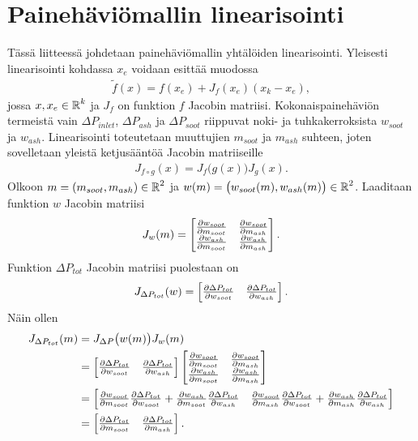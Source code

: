 
\chapter{Painehäviömallin linearisointi}%
\label{ch:linearisointi}

Tässä liitteessä johdetaan painehäviömallin yhtälöiden linearisointi. Yleisesti linearisointi kohdassa \(x_e\) voidaan esittää muodossa
\begin{align}
    \tilde{f}(x) = f(x_e) +J_f (x_e) (x_k-x_e),
\end{align}
jossa \(x, x_e \in \operatorname{\mathbb{R}}^k\) ja \(J_f\) on funktion \(f\) Jacobin matriisi. 
Kokonaispainehäviön termeistä vain \(\Delta P_{inlet}\), \(\Delta P_{ash}\) ja \(\Delta P_{soot}\) riippuvat noki- ja tuhkakerroksista \(w_{soot}\) ja \(w_{ash}\). 
Linearisointi toteutetaan muuttujien \(m_{soot}\) ja \( m_{ash}\) suhteen, joten
sovelletaan yleistä ketjusääntöä Jacobin matriiseille
\begin{align}
    J_{f \circ g}(x) = J_f\big(g(x)\big)  J_g(x).
\end{align}
Olkoon \(m = \left(m_{soot}, m_{ash}\right) \in \operatorname{\mathbb{R}}^2\) ja \(w(m) = \big(w_{soot}(m), w_{ash}(m)  \big) \in \operatorname{\mathbb{R}}^2\). Laaditaan funktion \(w\) Jacobin matriisi
\begin{align}
    J_w(m)=
    \begin{bmatrix} 
        \frac{\partial w_{soot}}{\partial m_{soot}} & \frac{\partial w_{soot}}{\partial m_{ash}}
    \\  \frac{\partial w_{ash}}{\partial m_{soot}} & \frac{\partial w_{ash}}{\partial m_{ash}}
     \end{bmatrix}.
\end{align}
 Funktion \(\Delta P_{tot}\) Jacobin matriisi puolestaan on 
\begin{align}
    J_{\Delta P_{tot}}(w) = \begin{bmatrix}   \frac{\partial \Delta P_{tot}}{\partial w_{soot}}
    &   \frac{\partial \Delta P_{tot}}{\partial w_{ash}}
     \end{bmatrix}.
\end{align}
Näin ollen 
\begin{align}
    \begin{split}
        J_{\Delta P_{tot}}(m)&=
        J_{\Delta P}\big(w(m)\big)  J_{w}(m)
\\ &=
    \begin{bmatrix}   
        \frac{\partial \Delta P_{tot}}{\partial w_{soot}}
        &   
        \frac{\partial \Delta P_{tot}}{\partial w_{ash}}
         \end{bmatrix}
    \begin{bmatrix} 
        \frac{\partial w_{soot}}{\partial m_{soot}} & \frac{\partial w_{soot}}{\partial m_{ash}}
        \\ 
        \frac{\partial w_{ash}}{\partial m_{soot}} & \frac{\partial w_{ash}}{\partial m_{ash}}
         \end{bmatrix}
\\ &=
    \begin{bmatrix} 
        \frac{\partial w_{soot}}{\partial m_{soot}}
        \frac{\partial \Delta P_{tot}}{\partial w_{soot}}
        +
        \frac{\partial w_{ash}}{\partial m_{soot}}
        \frac{\partial \Delta P_{tot}}{\partial w_{ash}}
        &
        \frac{\partial w_{soot}}{\partial m_{ash}}
        \frac{\partial \Delta P_{tot}}{\partial w_{soot}}
        +
        \frac{\partial w_{ash}}{\partial m_{ash}}
        \frac{\partial \Delta P_{tot}}{\partial w_{ash}}
     \end{bmatrix} 
\\ &= 
    \begin{bmatrix} \frac{\partial \Delta P_{tot}}{\partial m_{soot}} 
        & \frac{\partial \Delta P_{tot}}{\partial m_{ash}} \end{bmatrix}.
    \end{split}
\end{align}
